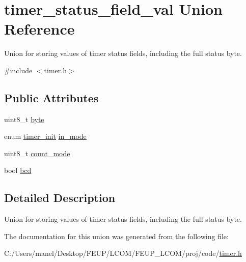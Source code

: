 \hypertarget{uniontimer__status__field__val}{}\section{timer\+\_\+status\+\_\+field\+\_\+val Union Reference}
\label{uniontimer__status__field__val}


Union for storing values of timer status fields, including the full status byte.  




{\ttfamily \#include $<$timer.\+h$>$}

\subsection*{Public Attributes}
\begin{DoxyCompactItemize}
\item 
uint8\+\_\+t \mbox{\hyperlink{group__timer_ga37d15361e9d111d7f18f943d85964f51}{byte}}
\item 
enum \mbox{\hyperlink{group__timer_ga5cc20f14fd50625eea9b20f58fbe2a55}{timer\+\_\+init}} \mbox{\hyperlink{group__timer_ga16c0028c537ce578196381bdc0cd97fd}{in\+\_\+mode}}
\item 
uint8\+\_\+t \mbox{\hyperlink{group__timer_ga069cd58184fd977a3345d560f159037a}{count\+\_\+mode}}
\item 
bool \mbox{\hyperlink{group__timer_gad1c0daae1fe44fc16a05f435123a99f2}{bcd}}
\end{DoxyCompactItemize}


\subsection{Detailed Description}
Union for storing values of timer status fields, including the full status byte. 

The documentation for this union was generated from the following file\+:\begin{DoxyCompactItemize}
\item 
C\+:/\+Users/manel/\+Desktop/\+F\+E\+U\+P/\+L\+C\+O\+M/\+F\+E\+U\+P\+\_\+\+L\+C\+O\+M/proj/code/\mbox{\hyperlink{timer_8h}{timer.\+h}}\end{DoxyCompactItemize}
